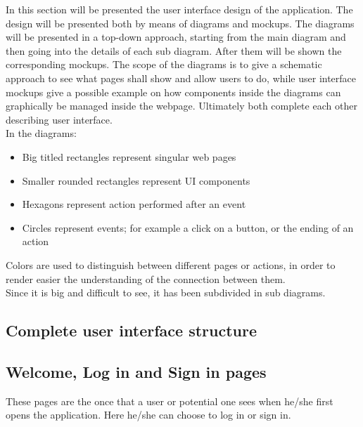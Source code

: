 
In this section will be presented the user interface design of the application. The design will be presented both by means of diagrams and mockups. The diagrams will be presented in a top-down approach, starting from the main diagram and then going into the details of each sub diagram. After them will be shown the corresponding mockups. The scope of the diagrams is to give a schematic approach to see what pages shall show and allow users to do, while user interface mockups give a possible example on how components inside the diagrams can graphically be managed inside the webpage. Ultimately both complete each other describing user interface.\\
In the diagrams:
\begin{itemize}
    \item Big titled rectangles represent singular web pages
    \item Smaller rounded rectangles represent UI components
    \item Hexagons represent action performed after an event
    \item Circles represent events; for example a click on a button, or the ending of an action
\end{itemize} 
Colors are used to distinguish between different pages or actions, in order to render easier the understanding of the connection between them.\\
Since it is big and difficult to see, it has been subdivided in sub diagrams.
\subsection{Complete user interface structure}
\clearpage
\subsection{Welcome, Log in and Sign in pages}
These pages are the once that a user or potential one sees when he/she first opens the application. Here he/she can choose to log in or sign in.\\
\clearpage
{}
\clearpage
